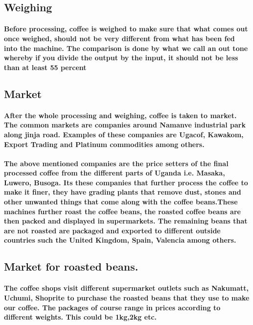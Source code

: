 \documentclass[12pt]{report}
\begin{document}
\subsection{Weighing}
\paragraph{Before processing, coffee is weighed to make sure that what comes out once weighed, should not be very different from what has been fed into the machine. The comparison is done by what we call an out tone whereby if you divide the output by the input, it should not be less than at least 55 percent}

\subsection{Market}
\paragraph{After the whole processing and weighing, coffee is taken to market. The common markets are companies around Namanve industrial park along jinja road.
	Examples of these companies are Ugacof, Kawakom, Export Trading and Platinum commodities among others.}

\paragraph{The above mentioned companies are the price setters of the final processed coffee from the different parts of Uganda i.e. Masaka, Luwero, Busoga.
	Its these companies that further process the coffee to make it finer, they have grading plants that remove dust, stones and other unwanted things that come along with the coffee beans.These machines further roast the coffee beans, the roasted coffee beans are then packed and displayed in supermarkets. The remaining beans that are not roasted are packaged and exported to different outside countries such the United Kingdom, Spain, Valencia among others.}

\subsection{Market for roasted beans.}
\paragraph{The coffee shops visit different supermarket outlets such as Nakumatt, Uchumi, Shoprite to purchase the roasted beans that they use to make our coffee.
	The packages of course range in prices according to different weights. This could be 1kg,2kg etc.}
\end{document}
